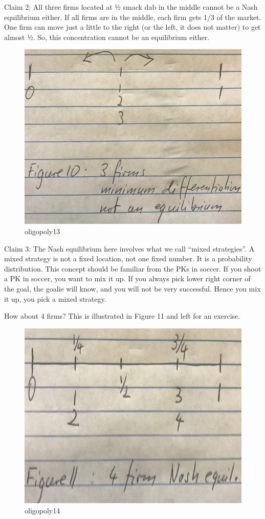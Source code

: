 \documentclass[
]{book}
\begin{document}
Claim 2: All three firms located at ½ smack dab in the middle cannot be a Nash equilibrium either. If all firms are in the middle, each firm gets 1/3 of the market. One firm can move just a little to the right (or the left, it does not matter) to get almost ½. So, this concentration cannot be an equilibrium either.

\begin{figure}

{\centering \includegraphics[width=0.5\linewidth]{img/oligopoly/fig13} 

}

\caption{oligopoly13}\label{fig:oligopoly13}
\end{figure}

Claim 3: The Nash equilibrium here involves what we call ``mixed strategies''. A mixed strategy is not a fixed location, not one fixed number. It is a probability distribution. This concept should be familiar from the PKs in soccer. If you shoot a PK in soccer, you want to mix it up. If you always pick lower right corner of the goal, the goalie will know, and you will not be very successful. Hence you mix it up, you pick a mixed strategy.

How about 4 firms? This is illustrated in Figure 11 and left for an exercise.

\begin{figure}

{\centering \includegraphics[width=0.5\linewidth]{img/oligopoly/fig14} 

}

\caption{oligopoly14}\label{fig:oligopoly14}
\end{figure}
\end{document}
